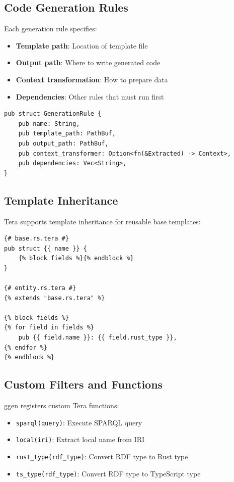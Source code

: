 \subsection{Code Generation Rules}

Each generation rule specifies:
\begin{itemize}
    \item \textbf{Template path}: Location of template file
    \item \textbf{Output path}: Where to write generated code
    \item \textbf{Context transformation}: How to prepare data
    \item \textbf{Dependencies}: Other rules that must run first
\end{itemize}

\begin{verbatim}
pub struct GenerationRule {
    pub name: String,
    pub template_path: PathBuf,
    pub output_path: PathBuf,
    pub context_transformer: Option<fn(&Extracted) -> Context>,
    pub dependencies: Vec<String>,
}
\end{verbatim}

\subsection{Template Inheritance}

Tera supports template inheritance for reusable base templates:

\begin{verbatim}
{# base.rs.tera #}
pub struct {{ name }} {
    {% block fields %}{% endblock %}
}

{# entity.rs.tera #}
{% extends "base.rs.tera" %}

{% block fields %}
{% for field in fields %}
    pub {{ field.name }}: {{ field.rust_type }},
{% endfor %}
{% endblock %}
\end{verbatim}

\subsection{Custom Filters and Functions}

ggen registers custom Tera functions:

\begin{itemize}
    \item \texttt{sparql(query)}: Execute SPARQL query
    \item \texttt{local(iri)}: Extract local name from IRI
    \item \texttt{rust_type(rdf_type)}: Convert RDF type to Rust type
    \item \texttt{ts_type(rdf_type)}: Convert RDF type to TypeScript type
\end{itemize}

